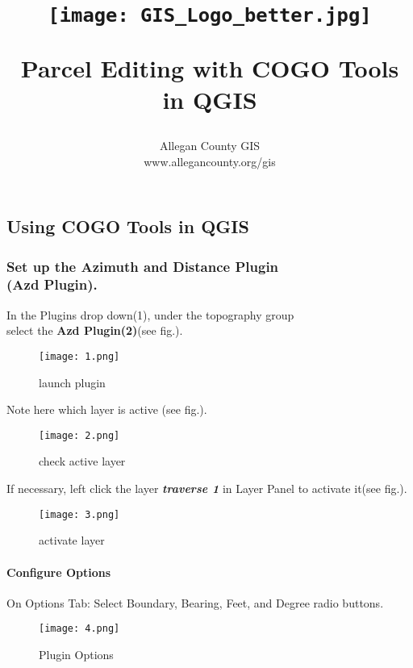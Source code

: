 \documentclass[class=book , crop=false]{standalone}
\title{ %
\HRule %
\\[.4cm] %
\begin{figure}[H] %
\begin{center}	%
	\texttt{[image: GIS\_Logo\_better.jpg]}
	\end{center}
	\end{figure}
	\Huge \bfseries Parcel Editing with COGO Tools in QGIS %
\HRule \\[.4cm] %
}  %
\author{\Large Allegan County GIS \\\Large www.allegancounty.org/gis} %
\begin{document}

\maketitle %

\subsection{Using COGO Tools in QGIS}
	\medskip 
	\subsubsection{\Large Set up the Azimuth and Distance Plugin \\\small(Azd Plugin).}
	\medskip
		\large In the Plugins drop down(1), \large under the topography group\\\Large select the \textbf {Azd Plugin(2)}(see fig.).
		\begin{figure}[H] %
		\begin{center}
		\texttt{[image: 1.png]}
		\end{center}
		\caption{launch plugin}
		\end{figure}
\clearpage
		
		\large Note here which layer is active (see fig.).
		\begin{figure}[H] %
		\begin{center}
		\texttt{[image: 2.png]}
		\end{center}
		\caption{check active layer}
		\end{figure}


		If necessary, left click the layer \textbf {\emph{traverse 1}} in Layer Panel to activate it(see fig.).
			\begin{figure}[H] %
			\begin{center}
			\texttt{[image: 3.png]}
			\end{center}
			\caption{activate layer}
			\end{figure}

\clearpage

		\paragraph{Configure Options}
			\large On Options Tab: Select Boundary, Bearing, Feet, and Degree radio buttons.
			\begin{figure}[H]
			\begin{center}
			\texttt{[image: 4.png]}
			\end{center}
			\caption{Plugin Options}
			\end{figure}
\clearpage
\end{document}
